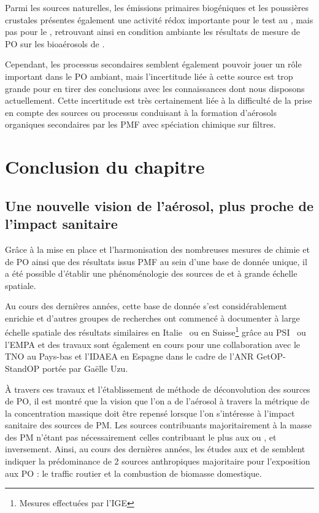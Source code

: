 Parmi les sources naturelles, les émissions primaires biogéniques et les poussières
crustales présentes également une activité rédox importante pour le test au \PODTT, mais
pas pour le \POAA, retrouvant ainsi en condition ambiante les résultats de mesure de PO
sur les bioaérosols de \cite{samakeUnexpected2017}.

Cependant, les processus secondaires semblent également pouvoir jouer un rôle important
dans le PO ambiant, mais l'incertitude liée à cette source est trop grande pour en tirer
des conclusions avec les connaissances dont nous disposons actuellement. Cette
incertitude est très certainement liée à la difficulté de la prise en compte des sources
ou processus conduisant à la formation d'aérosols organiques secondaires par les PMF avec
spéciation chimique sur filtres.


\section{Conclusion du chapitre}%
\label{sec:conclusion_chap4}

\subsection{Une nouvelle vision de l'aérosol, plus proche de l'impact sanitaire}%
\label{sub:une_nouvelle_vision_de_l_aérosol_plus_proche_de_l_impact_sanitaire}

Grâce à la mise en place et l'harmonisation des nombreuses mesures de chimie et de PO
ainsi que des résultats issus PMF au sein d'une base de donnée unique, il a été possible
d'établir une phénoménologie des sources de \POAA{} et \PODTT{} à grande échelle spatiale.

Au cours des dernières années, cette base de donnée s'est considérablement enrichie et
d'autres groupes de recherches ont commencé à documenter à large échelle spatiale des
résultats similaires en Italie~\autocite{pietrograndeReview2019} ou en
Suisse\footnote{Mesures effectuées par l'IGE} grâce au
PSI~\autocite{daellenbachSourcessubmitted} ou l'EMPA et des travaux sont également en
cours pour une collaboration avec le TNO au Pays-bas et l'IDAEA en Espagne dans le cadre
de l'ANR GetOP-StandOP portée par Gaëlle Uzu.

À travers ces travaux et l'établissement de méthode de déconvolution des sources de PO, il
est montré que la vision que l'on a de l'aérosol à travers la métrique de la
concentration massique doit être repensé lorsque l'on s'intéresse à l'impact sanitaire
des sources de PM. Les sources contribuants majoritairement à la masse des PM n'étant pas
nécessairement celles contribuant le plus aux \POAA{} ou \PODTT, et inversement.
Ainsi, au cours des dernières années, les études aux \POAA{} et \PODTT{} de
\cite{vermaReactive2014,batesReactive2015,fangOxidative2016,weberApportionment2018,cesariSource2019,daellenbachSourcessubmitted,weberSourceinprep.}
semblent indiquer la prédominance de 2 sources anthropiques majoritaire pour l'exposition
aux PO : le traffic routier et la combustion de biomasse domestique.

